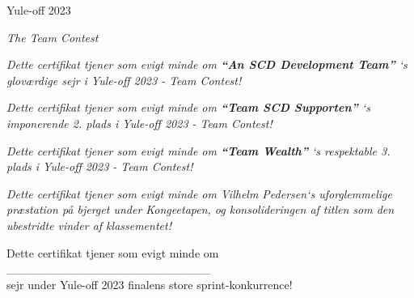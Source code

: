 \documentclass[danish]{article}
\begin{document}
  {\setmainfont{The Night Creatures} 
    {\Huge \color{cmartin}
       {Yule-off 2023}}
   }
   
   \vspace{2cm}

{
  \setmainfont{The Night Creatures} 
    {\huge \color{ctre}
       \textit{The Team Contest}
    }
}

 \vspace{2cm}

{
  \setmainfont{Ink Free} 
    {\large
       {\textit{
         Dette certifikat tjener som evigt minde om \textbf{``An SCD Development Team''} `s gloværdige sejr i Yule-off 2023 - Team Contest!
       }}
   }
 }

 \vspace{2cm}

{
  \setmainfont{Ink Free} 
    {\large
       {\textit{
         Dette certifikat tjener som evigt minde om \textbf{``Team SCD Supporten''} `s imponerende 2. plads i Yule-off 2023 - Team Contest!
       }}
   }
 }

 \vspace{2cm}

{
  \setmainfont{Ink Free} 
    {\large
       {\textit{
         Dette certifikat tjener som evigt minde om \textbf{``Team Wealth''} `s respektable 3. plads i Yule-off 2023 - Team Contest!
       }}
   }
 }

 \vspace{2cm}

{
  \setmainfont{Ink Free} 
    {\large
       {\textit{
         Dette certifikat tjener som evigt minde om Vilhelm Pedersen`s uforglemmelige præstation på bjerget under Kongeetapen, og konsolideringen af titlen som den ubestridte vinder af klassementet!
       }}
   }
 }

 \vspace{2cm}

{
  \setmainfont{Ink Free} 
    {\large
         Dette certifikat tjener som evigt minde om \_\_\_\_\_\_\_\_\_\_\_\_\_\_\_\_\_\_\_\_\_\_\_\_ \\
         
         sejr under Yule-off 2023 finalens store sprint-konkurrence!
   }
 }


 \vspace{2cm}
\end{document}
